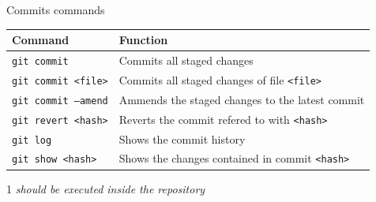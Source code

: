 \documentclass[10pt, graphics, aspectratio=169, table]{beamer}
\begin{document}
    \begin{frame}{Commits commands}
        \begin{table}
            \centering
            \begin{threeparttable}
                \begin{tabular}{ll}
                    \toprule
                    Command & Function \\
                    \midrule
                    \texttt{git commit} & Commits all staged changes\tnote{1} \\
                    \texttt{git commit <file>} & Commits all staged changes of file \texttt{<file>}\tnote{1} \\
                    \texttt{git commit --amend} & Ammends the staged changes to the latest commit\tnote{1} \\
                    \texttt{git revert <hash>} & Reverts the commit refered to with \texttt{<hash>}\tnote{1} \\
                    \texttt{git log} & Shows the commit history\tnote{1} \\
                    \texttt{git show <hash>} & Shows the changes contained in commit \texttt{<hash>}\tnote{1} \\
                    \bottomrule
                \end{tabular}
                \begin{tablenotes}
                    \item [1]\emph{should be executed inside the repository}
                \end{tablenotes}
            \end{threeparttable}
        \end{table}
    \end{frame}
\end{document}
